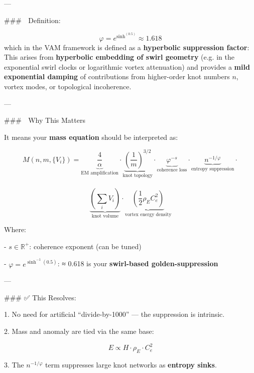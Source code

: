 \documentclass[11pt]{article}
\begin{document}
    ---

    ### 📐 Definition:

    $$
    \varphi = e^{\sinh^{(0.5)}} \approx 1.618
    $$
    which in the VAM framework is defined  as a \textbf{hyperbolic suppression factor}:
    This arises from \textbf{hyperbolic embedding of swirl geometry} (e.g. in the exponential swirl clocks or logarithmic vortex attenuation) and provides a \textbf{mild exponential damping} of contributions from higher-order knot numbers $n$, vortex modes, or topological incoherence.

    ---

    ### 🧠 Why This Matters

    It means your \textbf{mass equation} should be interpreted as:


    $$ M(n, m, \{V_i\}) = \underbrace{\frac{4}{\alpha}}_{\text{EM amplification}} \cdot  \underbrace{\left( \frac{1}{m} \right)^{3/2}}_{\text{knot topology}} \cdot  \underbrace{\varphi^{-s}}_{\text{coherence loss}} \cdot \underbrace{n^{-1/\varphi}}_{\text{entropy suppression}} \cdot $$\\
    $$ \underbrace{\left( \sum_i V_i \right)}_{\text{knot volume}} \cdot  \underbrace{\left( \frac{1}{2} \rho_{\scriptscriptstyle\boldsymbol\!E}C_e^2 \right)}_{\text{vortex energy density}}
    $$

    Where:

    -   $s \in \mathbb{R}^{+}$: coherence exponent (can be tuned)

    -   $\varphi = e^{\sinh^{-1}(0.5)}$: ≈ 0.618 is your \textbf{swirl-based golden-suppression}


    ---

    ### ✅ This Resolves:

    1.  No need for artificial “divide-by-1000” — the suppression is intrinsic.

    2.  Mass and anomaly are tied via the same base:

    $$
    E \propto H \cdot \rho_{\scriptscriptstyle\boldsymbol\!E}\cdot C_e^2
    $$

    3.  The $n^{-1/\varphi}$ term suppresses large knot networks as \textbf{entropy sinks}.
\end{document}
